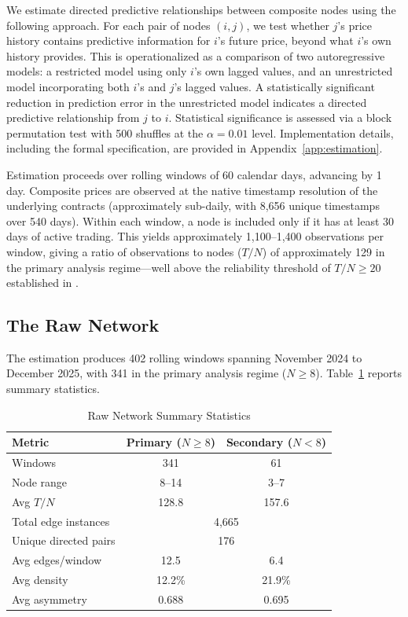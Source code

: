 \documentclass[12pt,letterpaper]{article}
\begin{document}
We estimate directed predictive relationships between composite nodes using the following approach. For each pair of nodes $(i,j)$, we test whether $j$'s price history contains predictive information for $i$'s future price, beyond what $i$'s own history provides. This is operationalized as a comparison of two autoregressive models: a restricted model using only $i$'s own lagged values, and an unrestricted model incorporating both $i$'s and $j$'s lagged values. A statistically significant reduction in prediction error in the unrestricted model indicates a directed predictive relationship from $j$ to $i$. Statistical significance is assessed via a block permutation test with 500 shuffles at the $\alpha=0.01$ level. Implementation details, including the formal specification, are provided in Appendix~\ref{app:estimation}.

Estimation proceeds over rolling windows of 60 calendar days, advancing by 1 day. Composite prices are observed at the native timestamp resolution of the underlying contracts (approximately sub-daily, with 8,656 unique timestamps over 540 days). Within each window, a node is included only if it has at least 30 days of active trading. This yields approximately 1,100--1,400 observations per window, giving a ratio of observations to nodes ($T/N$) of approximately 129 in the primary analysis regime---well above the reliability threshold of $T/N \geq 20$ established in \citet{yang2026te}.

\subsection{The Raw Network}

The estimation produces 402 rolling windows spanning November 2024 to December 2025, with 341 in the primary analysis regime ($N \geq 8$). Table~\ref{tab:rawnet} reports summary statistics.

\begin{table}[H]
\centering
\caption{Raw Network Summary Statistics}\label{tab:rawnet}
\begin{tabular}{lcc}
\toprule
Metric & Primary ($N \geq 8$) & Secondary ($N < 8$) \\
\midrule
Windows & 341 & 61 \\
Node range & 8--14 & 3--7 \\
Avg $T/N$ & 128.8 & 157.6 \\
Total edge instances & \multicolumn{2}{c}{4,665} \\
Unique directed pairs & \multicolumn{2}{c}{176} \\
Avg edges/window & 12.5 & 6.4 \\
Avg density & 12.2\% & 21.9\% \\
Avg asymmetry & 0.688 & 0.695 \\
\bottomrule
\end{tabular}
\end{table}
\end{document}
